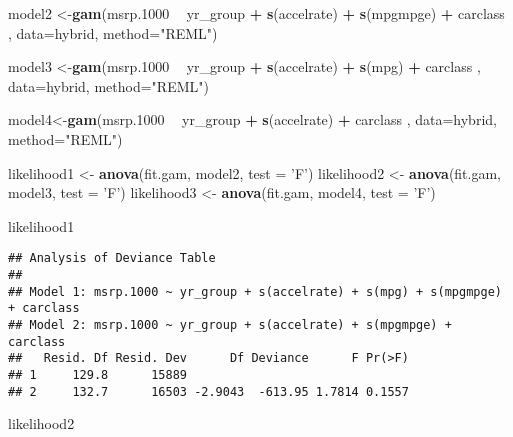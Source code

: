 \documentclass[]{article}
\newenvironment{Shaded}{\begin{snugshade}}{\end{snugshade}}
\newcommand{\DataTypeTok}[1]{\textcolor[rgb]{0.13,0.29,0.53}{#1}}
\newcommand{\FloatTok}[1]{\textcolor[rgb]{0.00,0.00,0.81}{#1}}
\newcommand{\KeywordTok}[1]{\textcolor[rgb]{0.13,0.29,0.53}{\textbf{#1}}}
\newcommand{\NormalTok}[1]{#1}
\newcommand{\OperatorTok}[1]{\textcolor[rgb]{0.81,0.36,0.00}{\textbf{#1}}}
\newcommand{\StringTok}[1]{\textcolor[rgb]{0.31,0.60,0.02}{#1}}
\begin{document}
\begin{Shaded}
\begin{Highlighting}[]
\NormalTok{model2 <-}\KeywordTok{gam}\NormalTok{(msrp}\FloatTok{.1000} \OperatorTok{~}\StringTok{ }\NormalTok{yr_group }\OperatorTok{+}\StringTok{ }\KeywordTok{s}\NormalTok{(accelrate) }\OperatorTok{+}\StringTok{ }\KeywordTok{s}\NormalTok{(mpgmpge) }\OperatorTok{+}\StringTok{ }\NormalTok{carclass , }\DataTypeTok{data=}\NormalTok{hybrid, }\DataTypeTok{method=}\StringTok{"REML"}\NormalTok{)}

\NormalTok{model3 <-}\KeywordTok{gam}\NormalTok{(msrp}\FloatTok{.1000} \OperatorTok{~}\StringTok{ }\NormalTok{yr_group }\OperatorTok{+}\StringTok{ }\KeywordTok{s}\NormalTok{(accelrate) }\OperatorTok{+}\StringTok{ }\KeywordTok{s}\NormalTok{(mpg) }\OperatorTok{+}\StringTok{ }\NormalTok{carclass , }\DataTypeTok{data=}\NormalTok{hybrid, }\DataTypeTok{method=}\StringTok{"REML"}\NormalTok{)}

\NormalTok{model4<-}\KeywordTok{gam}\NormalTok{(msrp}\FloatTok{.1000} \OperatorTok{~}\StringTok{ }\NormalTok{yr_group }\OperatorTok{+}\StringTok{ }\KeywordTok{s}\NormalTok{(accelrate) }\OperatorTok{+}\StringTok{ }\NormalTok{carclass , }\DataTypeTok{data=}\NormalTok{hybrid, }\DataTypeTok{method=}\StringTok{"REML"}\NormalTok{)}

\NormalTok{likelihood1 <-}\StringTok{ }\KeywordTok{anova}\NormalTok{(fit.gam, model2, }\DataTypeTok{test =} \StringTok{'F'}\NormalTok{)}
\NormalTok{likelihood2 <-}\StringTok{ }\KeywordTok{anova}\NormalTok{(fit.gam, model3, }\DataTypeTok{test =} \StringTok{'F'}\NormalTok{)}
\NormalTok{likelihood3 <-}\StringTok{ }\KeywordTok{anova}\NormalTok{(fit.gam, model4, }\DataTypeTok{test =} \StringTok{'F'}\NormalTok{)}

\NormalTok{likelihood1}
\end{Highlighting}
\end{Shaded}

\begin{verbatim}
## Analysis of Deviance Table
## 
## Model 1: msrp.1000 ~ yr_group + s(accelrate) + s(mpg) + s(mpgmpge) + carclass
## Model 2: msrp.1000 ~ yr_group + s(accelrate) + s(mpgmpge) + carclass
##   Resid. Df Resid. Dev      Df Deviance      F Pr(>F)
## 1     129.8      15889                               
## 2     132.7      16503 -2.9043  -613.95 1.7814 0.1557
\end{verbatim}

\begin{Shaded}
\begin{Highlighting}[]
\NormalTok{likelihood2}
\end{Highlighting}
\end{Shaded}
\end{document}
